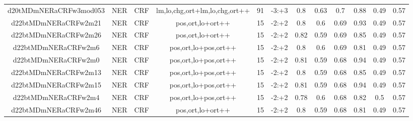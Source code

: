 \documentclass[a4paper]{article}
\begin{document}
\begin{landscape}
\begin{center}
\begin{tabular}{ |c|c|c|c|c|c|c|c|c|c|c|c|}
 	
 		
 		\small{ d20tMDmNERaCRFw3mod053 } & NER & CRF & lm,lo,chg,ort+lm,lo,chg,ort++  &  91 &  -3:+3  &  0.8 & 0.63 & 0.7  &  0.88 & 0.49 & 0.57 \\
 		

 	
 
 	
 		
 		\small{ d22btMDmNERaCRFw2m21 } & NER & CRF & pos,ort,lo+ort++  &  15 &  -2:+2  &  0.8 & 0.6 & 0.69  &  0.93 & 0.49 & 0.57 \\
 		

 	
 
 	
 		
 		\small{ d22btMDmNERaCRFw2m26 } & NER & CRF & pos,ort,lo+ort++  &  15 &  -2:+2  &  0.82 & 0.59 & 0.69  &  0.85 & 0.49 & 0.57 \\
 		

 	
 
 	
 		
 		\small{ d22btMDmNERaCRFw2m6 } & NER & CRF & pos,ort,lo+pos,ort++  &  15 &  -2:+2  &  0.8 & 0.6 & 0.69  &  0.81 & 0.49 & 0.57 \\
 		

 	
 
 	
 		
 		\small{ d22btMDmNERaCRFw2m0 } & NER & CRF & pos,ort,lo+pos,ort++  &  15 &  -2:+2  &  0.81 & 0.59 & 0.68  &  0.94 & 0.49 & 0.57 \\
 		

 	
 
 	
 		
 		\small{ d22btMDmNERaCRFw2m13 } & NER & CRF & pos,ort,lo+pos,ort++  &  15 &  -2:+2  &  0.8 & 0.59 & 0.68  &  0.85 & 0.49 & 0.57 \\
 		

 	
 
 	
 		
 		\small{ d22btMDmNERaCRFw2m15 } & NER & CRF & pos,ort,lo+pos,ort++  &  15 &  -2:+2  &  0.81 & 0.59 & 0.68  &  0.94 & 0.49 & 0.57 \\
 		

 	
 
 	
 		
 		\small{ d22btMDmNERaCRFw2m4 } & NER & CRF & pos,ort,lo+pos,ort++  &  15 &  -2:+2  &  0.78 & 0.6 & 0.68  &  0.82 & 0.5 & 0.57 \\
 		

 	
 
 	
 		
 		\small{ d22btMDmNERaCRFw2m46 } & NER & CRF & pos,ort,lo+ort++  &  15 &  -2:+2  &  0.8 & 0.59 & 0.68  &  0.81 & 0.49 & 0.57 \\
 		


\end{tabular}
\end{center}
\end{landscape}
\end{document}
